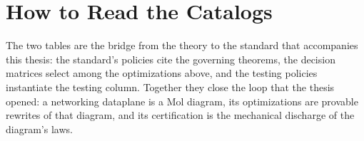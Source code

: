 \section{How to Read the Catalogs}
The two tables are the bridge from the theory to the standard that accompanies this thesis: the standard's policies cite the governing theorems, the decision matrices select among the optimizations above, and the testing policies instantiate the testing column. Together they close the loop that the thesis opened: a networking dataplane is a Mol diagram, its optimizations are provable rewrites of that diagram, and its certification is the mechanical discharge of the diagram's laws.
